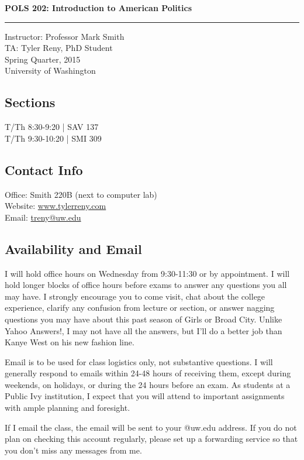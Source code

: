 \documentclass[12pt]{article}
\begin{document}
\pagestyle{empty}
\noindent \textbf{{\LARGE POLS 202: Introduction to American Politics}}\\
\rule{\textwidth}{1pt}
\begin{flushright}\noindent Instructor: Professor Mark Smith\\
TA: Tyler Reny, PhD Student\\
Spring Quarter, 2015\\
University of Washington\\
\end{flushright}

\subsection*{Sections}
T/Th 8:30-9:20 | SAV 137\\
T/Th 9:30-10:20 | SMI 309

\subsection*{Contact Info}
Office: Smith 220B (next to computer lab)\\
Website: \url{www.tylerreny.com}\\
Email: \url{treny@uw.edu}

\subsection*{Availability and Email}

I will hold office hours on Wednesday from 9:30-11:30 or by appointment. I will hold longer blocks of office hours before exams to answer any questions you all may have. I strongly encourage you to come visit, chat about the college experience, clarify any confusion from lecture or section, or answer nagging questions you may have about this past season of Girls or Broad City. Unlike Yahoo Answers!, I may not have all the answers, but I'll do a better job than Kanye West on his new fashion line.

Email is to be used for class logistics only, not substantive questions. I will generally respond to emails within 24-48 hours of receiving them, except during weekends, on holidays, or during the 24 hours before an exam. As students at a Public Ivy institution, I expect that you will attend to important assignments with ample planning and foresight.

If I email the class, the email will be sent to your @uw.edu address. If you do not plan on checking this account regularly, please set up a forwarding service so that you don't miss any messages from me.
\end{document}
